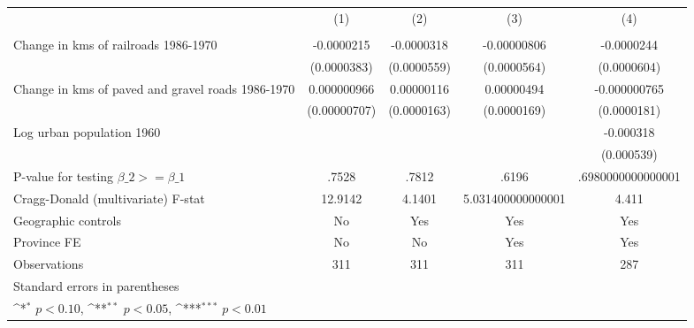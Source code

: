 {
\def\sym#1{\ifmmode^{#1}\else\(^{#1}\)\fi}
\begin{tabular}{l*{4}{c}}
\hline\hline
                &\multicolumn{1}{c}{(1)}&\multicolumn{1}{c}{(2)}&\multicolumn{1}{c}{(3)}&\multicolumn{1}{c}{(4)}\\
                &\multicolumn{1}{c}{}&\multicolumn{1}{c}{}&\multicolumn{1}{c}{}&\multicolumn{1}{c}{}\\
\hline
Change in kms of railroads 1986-1970&-0.0000215         &-0.0000318         &-0.00000806         &-0.0000244         \\
                &(0.0000383)         &(0.0000559)         &(0.0000564)         &(0.0000604)         \\
[1em]
Change in kms of paved and gravel roads 1986-1970&0.000000966         &0.00000116         &0.00000494         &-0.000000765         \\
                &(0.00000707)         &(0.0000163)         &(0.0000169)         &(0.0000181)         \\
[1em]
Log urban population 1960&                  &                  &                  &-0.000318         \\
                &                  &                  &                  &(0.000539)         \\
\hline
P-value for testing $\beta\_{2} >= \beta\_{1}$&    .7528         &    .7812         &    .6196         &.6980000000000001         \\
Cragg-Donald (multivariate) F-stat&  12.9142         &   4.1401         &5.031400000000001         &    4.411         \\
Geographic controls&       No         &      Yes         &      Yes         &      Yes         \\
Province FE     &       No         &       No         &      Yes         &      Yes         \\
Observations    &      311         &      311         &      311         &      287         \\
\hline\hline
\multicolumn{5}{l}{\footnotesize Standard errors in parentheses}\\
\multicolumn{5}{l}{\footnotesize \sym{*} \(p<0.10\), \sym{**} \(p<0.05\), \sym{***} \(p<0.01\)}\\
\end{tabular}
}
